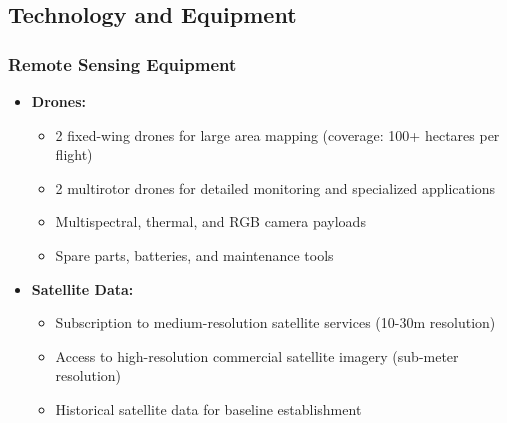 \subsection{Technology and Equipment}

\subsubsection{Remote Sensing Equipment}
\begin{itemize}
    \item \textbf{Drones:}
    \begin{itemize}
        \item 2 fixed-wing drones for large area mapping (coverage: 100+ hectares per flight)
        \item 2 multirotor drones for detailed monitoring and specialized applications
        \item Multispectral, thermal, and RGB camera payloads
        \item Spare parts, batteries, and maintenance tools
    \end{itemize}
    
    \item \textbf{Satellite Data:}
    \begin{itemize}
        \item Subscription to medium-resolution satellite services (10-30m resolution)
        \item Access to high-resolution commercial satellite imagery (sub-meter resolution)
        \item Historical satellite data for baseline establishment
    \end{itemize}
\end{itemize}

